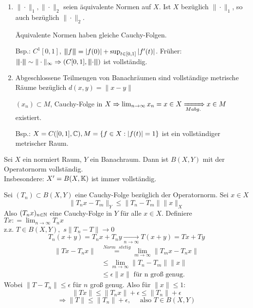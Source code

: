 \begin{bemerkung}
	\begin{enumerate}[label=\alph*\upshape)]
		\item $\| \cdot \|_{1}, \| \cdot \|_{2}$ seien äquivalente Normen auf $X$. Ist $X$ bezüglich $\| \cdot \|_{1}$, so auch bezüglich $\| \cdot \|_{2}$.
			\begin{beweis}
				Äquivalente Normen haben gleiche Cauchy-Folgen.
			\end{beweis}
			Bsp.: $C^{1}[0, 1]$, ${\left\vert\kern-0.25ex\left\vert\kern-0.25ex\left\vert f\right\vert\kern-0.25ex\right\vert\kern-0.25ex\right\vert} = |f(0)| + \sup_{t \in [0, 1]} | f'(t) |$. Früher: ${\left\vert\kern-0.25ex\left\vert\kern-0.25ex\left\vert\cdot\right\vert\kern-0.25ex\right\vert\kern-0.25ex\right\vert} \sim \| \cdot \|_{\infty} \Rightarrow \left( C[0, 1], {\left\vert\kern-0.25ex\left\vert\kern-0.25ex\left\vert\cdot\right\vert\kern-0.25ex\right\vert\kern-0.25ex\right\vert} \right)$ ist vollständig.
		\item Abgeschlossene Teilmengen von 	Banachräumen sind vollständige metrische Räume bezüglich $d(x, y) = \| x - y\|$
			\begin{beweis}
				$(x_{n}) \subset M$, Cauchy-Folge in $X \Rightarrow \lim_{n \rightarrow \infty} x_{n} = x \in X \xRightarrow[M abg.]{} x \in M$ existiert.	
			\end{beweis}
			Bsp.: $X = C([0, 1], \mathbb{C}), M = \{ f \in X: |f ( t )| = 1 \}$ ist ein vollständiger metrischer Raum.
	\end{enumerate}
\end{bemerkung}


\begin{satz}
	Sei $X$ ein normiert Raum, $Y$ ein Banachraum.
	Dann ist $B(X, Y)$ mit der Operatornorm vollständig. \\
	Insbesondere: $X' = B(X, \mathbb{K})$ ist immer  vollständig.
\end{satz}

\begin{beweis}
	Sei $(T_{n}) \subset B(X, Y)$ eine Cauchy-Folge bezüglich der Operatornorm. Sei $x \in X$
	\[ \| T_{n} x - T_{m} \|_{Y} \leq \| T_{n} - T_{m} \| \|x\|_{X} \]
	Also $(T_{n}x)_{n \in \mathbb{N}}$ eine Cauchy-Folge in $Y$ für alle $x \in X$. Definiere $T x : = \lim_{n \rightarrow \infty} T_{n} x$ \\
	z.z. $T \in B(X, Y),$ $s\| T_{n} - T \| \rightarrow 0$ \\
	\[ T_{n} (x + y)  = T_{n} x + T_{n} y \xrightarrow[n \rightarrow \infty]{} T(x + y) = Tx + Ty \]
	\begin{align*}
		\| Tx - T_{n}x \| & \overset{Norm \text{ } stetig}{=} \lim_{m \rightarrow \infty} \| T_{m} x - T_{n} x \| \\
		 & \leq \lim_{m \rightarrow \infty} \| T_{n} - T_{m} \| \| x \| \\
		 & \leq \epsilon \| x \| \text{ für n gro{\ss} genug.}
	\end{align*}
	Wobei $\| T - T_{n} \| \leq \epsilon$ für $n$ gro{\ss} genug.
	Also für $\| x \| \leq 1$:
	\[ \| T x \| \leq \| T_{n} x \| + \epsilon \leq \| T_{n} \| + \epsilon  \]
	\[ \Rightarrow \| T \| \leq \| T_{n} \| + \epsilon, \quad \text{ also } T \in B(X, Y) \]
\end{beweis}


